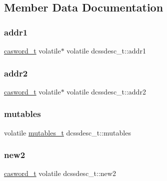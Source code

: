 \subsection{Member Data Documentation}
\mbox{\label{classdcssdesc__t_a61326e9aa1b6b4d49461340997dcb636}} 
\subsubsection{\texorpdfstring{addr1}{addr1}}
{\footnotesize\ttfamily \hyperlink{rq__unsafe_8h_ad45142aaf2ff20a036dc6242b8483e9c}{casword\+\_\+t} volatile$\ast$ volatile dcssdesc\+\_\+t\+::addr1}

\mbox{\label{classdcssdesc__t_a582de2e5799592e124400d256c85b281}} 
\subsubsection{\texorpdfstring{addr2}{addr2}}
{\footnotesize\ttfamily \hyperlink{rq__unsafe_8h_ad45142aaf2ff20a036dc6242b8483e9c}{casword\+\_\+t} volatile$\ast$ volatile dcssdesc\+\_\+t\+::addr2}

\mbox{\label{classdcssdesc__t_af1008652cb54a2fa90eb657d61c0038a}} 
\subsubsection{\texorpdfstring{mutables}{mutables}}
{\footnotesize\ttfamily volatile \hyperlink{descriptors_8h_a8a5af2749482b19d7515054489efca22}{mutables\+\_\+t} dcssdesc\+\_\+t\+::mutables}

\mbox{\label{classdcssdesc__t_aa8e70f20c6b69b7a9a604fa15c4de10c}} 
\subsubsection{\texorpdfstring{new2}{new2}}
{\footnotesize\ttfamily \hyperlink{rq__unsafe_8h_ad45142aaf2ff20a036dc6242b8483e9c}{casword\+\_\+t} volatile dcssdesc\+\_\+t\+::new2}

